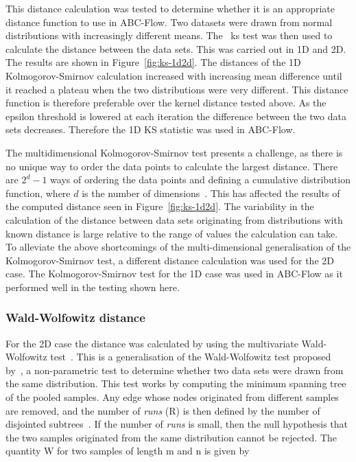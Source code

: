 This distance calculation was tested to determine whether it is an appropriate distance function to use in ABC-Flow. Two datasets were drawn from normal distributions with increasingly different means. The ~\acrshort{ks} test was then used to calculate the distance between the data sets. This was carried out in 1D and 2D. The results are shown in Figure~\ref{fig:ks-1d2d}. The distances of the 1D Kolmogorov-Smirnov calculation increased with increasing mean difference until it reached a plateau when the two distributions were very different. This distance function is therefore preferable over the kernel distance tested above. As the epsilon threshold is lowered at each iteration the difference between the two data sets decreases. Therefore the 1D KS statistic was used in ABC-Flow. 


The multidimensional Kolmogorov-Smirnov test presents a challenge, as there is no unique way to order the data points to calculate the largest distance. There are  $2^d − 1$ ways of ordering the data points and defining a cumulative distribution function, where $d$ is the number of dimensions~\autocite{Lopes:2007vk}. This has affected the results of the computed distance seen in Figure~\ref{fig:ks-1d2d}. The variability in the calculation of the distance between data sets originating from distributions with known distance is large relative to the range of values the calculation can take. To alleviate the above shortcomings of the multi-dimensional generalisation of the Kolmogorov-Smirnov test, a different distance calculation was used for the 2D case. The Kolmogorov-Smirnov test for the 1D case was used in ABC-Flow as it performed well in the testing shown here. 

 
\subsubsection{Wald-Wolfowitz distance}

For the 2D case the distance was calculated by using the multivariate Wald-Wolfowitz test~\autocite{Friedman:1979vm}. This is a generalisation of the Wald-Wolfowitz test proposed by~\autocite{Wald:1940wt}, a non-parametric test to determine whether two data sets were drawn from the same distribution. This test works by computing the minimum spanning tree of the pooled samples. Any edge whose nodes originated from different samples are removed, and the number of \textit{runs} (R) is then defined by the number of disjointed subtrees~\autocite{Friedman:1979vm}. If the number of \textit{runs} is small, then the null hypothesis that the two samples originated from the same distribution cannot be rejected. The quantity W for two samples of length m and n is given by 
 
